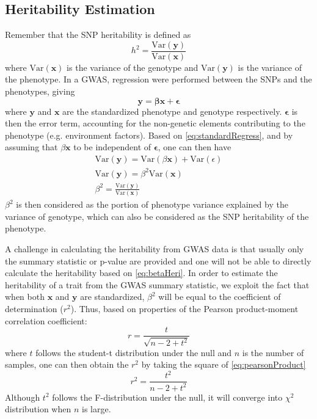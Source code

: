 \documentclass[12pt]{scrbook}
\begin{document}
\subsection{Heritability Estimation}
Remember that the \gls{SNP} heritability is defined as 
$$
h^2 = \frac{\mathrm{Var}(\boldsymbol{y})}{\mathrm{Var}(\boldsymbol{x})}
$$
where $\mathrm{Var}(\boldsymbol{x})$ is the variance of the genotype and $\mathrm{Var}(\boldsymbol{y})$ is the variance of the phenotype.
In a \gls{GWAS}, regression were performed between the \glspl{SNP} and the phenotypes, giving
\begin{equation}
\boldsymbol{y}=\boldsymbol{\beta x}+\boldsymbol{\epsilon}
\label{eq:standardRegress}
\end{equation}
where $\boldsymbol{y}$ and $\boldsymbol{x}$ are the standardized phenotype and genotype respectively. 
$\boldsymbol{\epsilon}$ is then the error term, accounting for the non-genetic elements contributing to the phenotype (e.g. environment factors).
Based on \cref{eq:standardRegress}, and by assuming that $\beta \boldsymbol{x}$ to be independent of $\boldsymbol{\epsilon}$, one can then have
\begin{align}
\mathrm{Var}(\boldsymbol{y}) = \mathrm{Var}(\beta \boldsymbol{x})+ \mathrm{Var}(\epsilon) \nonumber\\
\mathrm{Var}(\boldsymbol{y}) = \beta^2\mathrm{Var}(\boldsymbol{x}) \nonumber\\
\beta^2= \frac{\mathrm{Var}(\boldsymbol{y})}{\mathrm{Var}(\boldsymbol{x})}
\label{eq:betaHeri}
\end{align}
$\beta^2$ is then considered as the portion of phenotype variance explained by the variance of genotype, which can also be considered as the \gls{SNP} heritability of the phenotype.

A challenge in calculating the heritability from \gls{GWAS} data is that usually only the summary statistic or p-value are provided and one will not be able to directly calculate the heritability based on \cref{eq:betaHeri}. 
In order to estimate the heritability of a trait from the \gls{GWAS} summary statistic, we exploit the fact that when both $\boldsymbol{x}$ and $\boldsymbol{y}$ are standardized, $\beta^2$ will be equal to the coefficient of determination ($r^2$). 
Thus, based on properties of the Pearson product-moment correlation coefficient:
\begin{equation}
r = \frac{t}{\sqrt{n-2+t^2}}
\label{eq:pearsonProduct}
\end{equation}
where $t$ follows the student-t distribution under the null and $n$ is the number of samples, one can then obtain the $r^2$ by taking the square of \cref{eq:pearsonProduct}
\begin{equation}
r^2 = \frac{t^2}{n-2+t^2}
\label{eq:oriRSquared}
\end{equation}
Although $t^2$ follows the F-distribution under the null, it will converge into $\chi^2$ distribution when $n$ is large.
\end{document}
